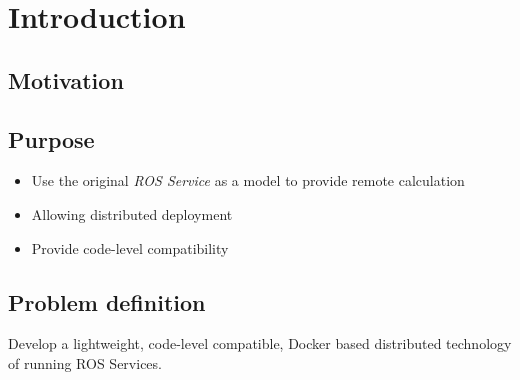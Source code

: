 \section{Introduction}

\subsection{Motivation}

\subsection{Purpose}

\begin{itemize}
    \item Use the original \emph{ROS Service} as a model to provide remote calculation
    \item Allowing distributed deployment
    \item Provide code-level compatibility
\end{itemize}

\subsection{Problem definition}

Develop a lightweight, code-level compatible, Docker based distributed technology of running ROS Services.



